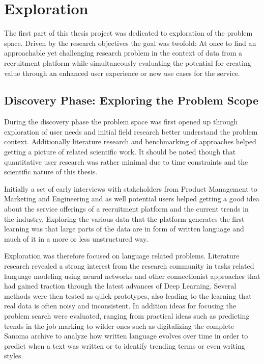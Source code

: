 
\clearpage

\section{Exploration}
\label{sec:Exploration}

The first part of this thesis project was dedicated to exploration of the problem space. Driven by the research objectives the goal was twofold: At once to find an approachable yet challenging research problem in the context of data from a recruitment platform while simultaneously evaluating the potential for creating value through an enhanced user experience or new use cases for the service.

\subsection{Discovery Phase: Exploring the Problem Scope}
\label{Discovery Phase: Exploring the Problem Scope}

During the discovery phase the problem space was first opened up through exploration of user needs and initial field research better understand the problem context. Additionally literature research and benchmarking of approaches helped getting a picture of related scientific work. It should be noted though that quantitative user research was rather minimal due to time constraints and the scientific nature of this thesis.

Initially a set of early interviews with stakeholders from Product Management to Marketing and Engineering and as well potential users helped getting a good idea about the service offerings of a recruitment platform and the current trends in the industry. Exploring the various data that the platform generates the first learning was that large parts of the data are in form of written language and much of it in a more or less unstructured way.

Exploration was therefore focused on language related problems. Literature research revealed a strong interest from the research community in tasks related language modeling using neural networks and other connectionist approaches that had gained traction through the latest advances of \gls{Deep Learning}. Several methods were then tested as quick prototypes, also leading to the learning that real data is often noisy and inconsistent. In addition ideas for focusing the problem search were evaluated, ranging from practical ideas such as predicting trends in the job marking to wilder ones such as digitalizing the complete Sanoma archive to analyze how written language evolves over time in order to predict when a text was written or to identify trending terms or even writing styles.

